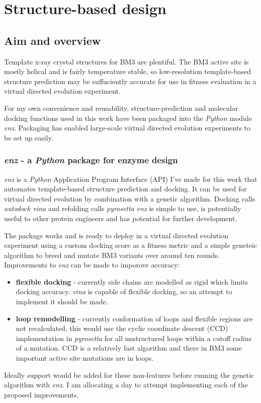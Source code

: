 \documentclass{article}
\begin{document}
\section{Structure-based design}

\subsection{Aim and overview}
Template x-ray crystal structures for BM3 are plentiful. The BM3 active site is mostly helical and is fairly temperature stable, so low-resolution template-based structure prediction may be suffuciently accurate for use in fitness evaluation in a virtual directed evolution experiment. %
\par
For my own convenience and reusability, structure-prediction and molecular docking functions used in this work have been packaged into the \textit{Python} module \textit{enz}. Packaging has enabled large-scale virtual directed evolution experiments to be set up easily. %


\subsubsection{\textit{enz} - a \textit{Python} package for enzyme design}
\textit{enz} is a \textit{Python} Application Program Interface (API) I've made for this work that automates template-based structure prediction and docking. It can be used for virtual directed evolution by combination with a genetic algorithm. Docking calls \textit{autodock vina} and refolding calls \textit{pyrosetta} %
\textit{enz} is simple to use, is potentially useful to other protein engineers and has potential for further development. %
\par
The package works and is ready to deploy in a virtual directed evolution experiment using a custom docking score as a fitness metric and a simple geneteic algorithm to breed and mutate BM3 variants over around ten rounds. %
Improvements to \textit{enz} can be made to imporove accuracy: %
\begin{itemize}
	\item \textbf{flexible docking} - currently side chains are modelled as rigid which limits docking accuracy. \textit{vina} is capable of flexible docking, so an attempt to implement it should be made. 
	\item \textbf{loop remodelling} - currently conformation of loops and flexible regions are not recalculated, this would use the cyclic coordinate descent (CCD) implementation in \textit{pyrosetta} for all unstructured loops within a cutoff radius of a mutation. CCD is a relatively fast algorithm and there in BM3 some important active site mutations are in loops.
\end{itemize}
Ideally support would be added for these non-features before running the genetic algorithm with \textit{enz}. I am allocating a day to attempt implementing each of the proposed improvements. %
\par
\end{document}
